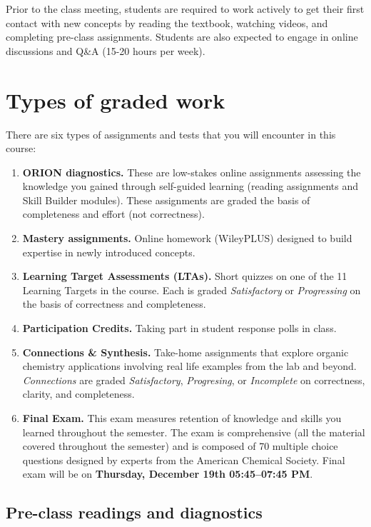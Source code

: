 Prior to the class meeting, students are required to work actively to
get their first contact with new concepts by reading the textbook,
watching videos, and completing pre-class assignments. Students are also
expected to engage in online discussions and Q\&A (15-20 hours per
week).

\hypertarget{types-of-graded-work}{%
\section{Types of graded work}\label{types-of-graded-work}}

There are six types of assignments and tests that you will encounter in
this course:

\begin{enumerate}
\def\labelenumi{\arabic{enumi}.}
\tightlist
\item
  \textbf{ORION diagnostics.} These are low-stakes online assignments
  assessing the knowledge you gained through self-guided learning
  (reading assignments and Skill Builder modules). These assignments are
  graded the basis of completeness and effort (not correctness).
\item
  \textbf{Mastery assignments.} Online homework (WileyPLUS) designed to
  build expertise in newly introduced concepts.
\item
  \textbf{Learning Target Assessments (LTAs).} Short quizzes on one of
  the 11 Learning Targets in the course. Each is graded
  \emph{Satisfactory} or \emph{Progressing} on the basis of correctness
  and completeness.
\item
  \textbf{Participation Credits.} Taking part in student response polls
  in class.
\item
  \textbf{Connections \& Synthesis.} Take-home assignments that explore
  organic chemistry applications involving real life examples from the
  lab and beyond. \emph{Connections} are graded \emph{Satisfactory},
  \emph{Progresing}, or \emph{Incomplete} on correctness, clarity, and
  completeness.
\item
  \textbf{Final Exam.} This exam measures retention of knowledge and
  skills you learned throughout the semester. The exam is comprehensive
  (all the material covered throughout the semester) and is composed of
  70 multiple choice questions designed by experts from the American
  Chemical Society. Final exam will be on \textbf{Thursday, December
  19th 05:45--07:45 PM}.
\end{enumerate}

\hypertarget{pre-class-readings-and-diagnostics}{%
\subsection{Pre-class readings and
diagnostics}\label{pre-class-readings-and-diagnostics}}

